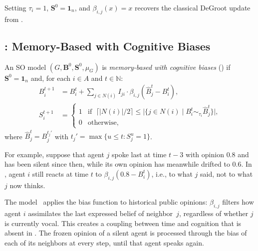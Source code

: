 \begin{remark}\label{rem:degroot-cbsom-minus}
  Setting $\tau_i=1$, $\mathbf{S}^0=\mathbf{1}_n$, and
  $\beta_{i,j}(x)=x$ recovers the classical DeGroot update from
  \CBSOMminus.
\end{remark}

\subsection{\texorpdfstring{\CBSOMplus}{CBSOM+}: Memory-Based with Cognitive Biases}
\label{sec:cbsom-plus}

\begin{definition}[\CBSOMplus]\label{def:cbsom-plus}
  An SO model $(G,\mathbf{B}^0,\mathbf{S}^0,\mu_G)$ is
  \emph{memory-based with cognitive biases} (\CBSOMplus) if
  $\mathbf{S}^0=\mathbf{1}_n$ and, for each $i\in A$ and
  $t\in\mathbb{N}$:
  \begin{align}
    B_i^{t+1} &= B_i^t
      + \sum_{j\in N(i)} I_{ji}
        \cdot\beta_{i,j}(\hat{B}_j^t - B_i^t),
    \label{eq:cbsom-plus-b}\\
    S_i^{t+1} &=
    \begin{cases}
      1 & \text{if }\;\bigl\lceil|N(i)|/2\bigr\rceil
          \le\bigl|\{j\in N(i)\mid
            B_i^t\sim_{\tau_i}\hat{B}_j^t\}\bigr|,\\
      0 & \text{otherwise,}
    \end{cases}
    \label{eq:cbsom-plus-s}
  \end{align}
  where $\hat{B}_j^t=B_j^{t_j'}$ with
  $t_j'=\max\{u\le t:S_j^u=1\}$.
\end{definition}

For example, suppose that agent $j$ spoke last at time $t-3$ with
opinion $0.8$ and has been silent since then, while its own opinion has
meanwhile drifted to $0.6$. In \CBSOMplus, agent $i$ still reacts at time
$t$ to $\beta_{i,j}(0.8-B_i^t)$, i.e., to what $j$ said, not to what $j$
now thinks.

The model \CBSOMplus\ applies the bias function to historical public
opinions: $\beta_{i,j}$ filters how agent $i$ assimilates the last
expressed belief of neighbor~$j$, regardless of whether $j$ is currently
vocal. This creates a coupling between time and cognition that is absent
in \CBSOMminus. The frozen opinion of a silent agent is processed through
the bias of each of its neighbors at every step, until that agent speaks
again.


